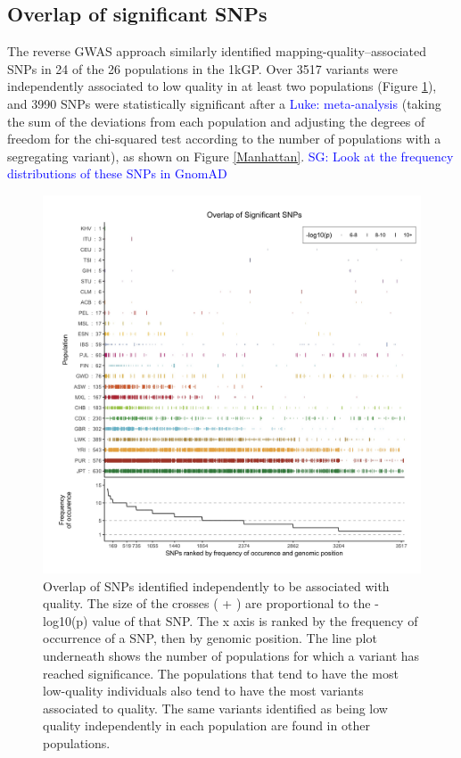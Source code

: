 \documentclass[9pt,lineno]{elife}
\newcommand{\sgcomment}[1]{\textcolor{blue}{SG: #1}}
\newcommand{\luke}[1]{\textcolor{blue}{Luke: #1}}
\begin{document}
\subsection{Overlap of significant SNPs}
The reverse GWAS approach similarly identified mapping-quality--associated SNPs in 24 of the 26 populations in the 1kGP.
Over 3517 variants were independently associated to low quality in at least two populations  (Figure \ref{OverLap}), and 3990 SNPs were statistically significant after a \luke{meta-analysis} (taking the sum of the deviations from each population and adjusting the degrees of freedom for the chi-squared test according to the number of populations with a segregating variant), as shown on Figure \ref{Manhattan}.  
\sgcomment{Look at the frequency distributions of these SNPs in GnomAD}

\begin{figure}
\includegraphics[width=\hsize,keepaspectratio]{./Figures/SNPOverlap6.jpg}

\caption{Overlap of SNPs identified independently to be associated with quality. 
The size of the crosses ( + ) are proportional to the -log10(p) value of that SNP.
The x axis is ranked by the frequency of occurrence of a SNP, then by genomic position.
The line plot underneath shows the number of populations for which a variant has reached significance.
The populations that tend to have the most low-quality individuals also tend to have the most variants associated to quality. 
The same variants identified as being low quality independently in each population are found in other populations. }
  \label{OverLap}
\end{figure}
\end{document}
